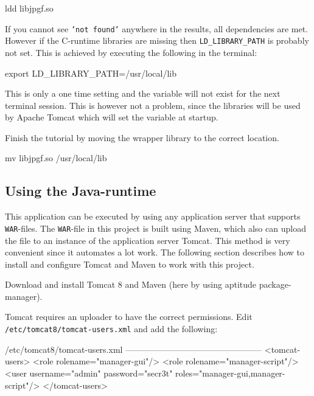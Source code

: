 \begin{terminal}
ldd libjpgf.so
\end{terminal}

If you cannot see \texttt{'not found'} anywhere in the results, all dependencies are met. However if the C-runtime libraries are missing then \texttt{LD\_LIBRARY\_PATH} is probably not set. This is achieved by executing the following in the terminal:

\begin{terminal}
export LD_LIBRARY_PATH=/usr/local/lib
\end{terminal}

This is only a one time setting and the variable will not exist for the next terminal session. This is however not a problem, since the libraries will be used by Apache Tomcat which will set the variable at startup.

Finish the tutorial by moving the wrapper library to the correct location.

\begin{terminal}
mv libjpgf.so /usr/local/lib
\end{terminal}

\subsection{Using the Java-runtime}
This application can be executed by using any application server that supports \texttt{WAR}-files. The \texttt{WAR}-file in this project is built using Maven, which also can upload the file to an instance of the application server Tomcat. This method is very convenient since it automates a lot work. The following section describes how to install and configure Tomcat and Maven to work with this project.

Download and install Tomcat 8 and Maven (here by using aptitude package-manager).


Tomcat requires an uploader to have the correct permissions.
\newline
Edit \texttt{/etc/tomcat8/tomcat-users.xml} and add the following:

\begin{terminal}
/etc/tomcat8/tomcat-users.xml
------------------------------------------------
<tomcat-users>
  <role rolename="manager-gui"/>
  <role rolename="manager-script"/>
  <user username="admin" password="secr3t" roles="manager-gui,manager-script"/>
</tomcat-users>
\end{terminal}


